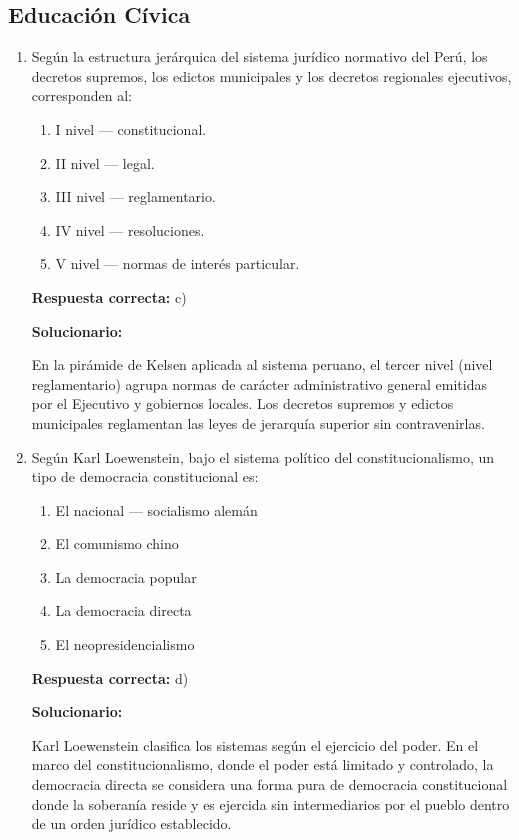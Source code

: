 \subsection*{Educación Cívica}

\begin{enumerate}[resume]
	
	\item Según la estructura jerárquica del sistema jurídico normativo del Perú, los decretos supremos, los edictos municipales y los decretos regionales ejecutivos, corresponden al:
	
	\begin{enumerate}[label=\alph*)]
		\item I nivel — constitucional.
		\item II nivel — legal.
		\item III nivel — reglamentario.
		\item IV nivel — resoluciones.
		\item V nivel — normas de interés particular.
	\end{enumerate}
	
	\textbf{Respuesta correcta:} c)
	
	\vspace{2mm}
	\textbf{Solucionario:}
	
	En la pirámide de Kelsen aplicada al sistema peruano, el tercer nivel (nivel reglamentario) agrupa normas de carácter administrativo general emitidas por el Ejecutivo y gobiernos locales. Los decretos supremos y edictos municipales reglamentan las leyes de jerarquía superior sin contravenirlas.
	
	\vspace{6mm}
	
	\item Según Karl Loewenstein, bajo el sistema político del constitucionalismo, un tipo de democracia constitucional es:
	
	\begin{enumerate}[label=\alph*)]
		\item El nacional — socialismo alemán
		\item El comunismo chino
		\item La democracia popular
		\item La democracia directa
		\item El neopresidencialismo
	\end{enumerate}
	
	\textbf{Respuesta correcta:} d)
	
	\vspace{2mm}
	\textbf{Solucionario:}
	
	Karl Loewenstein clasifica los sistemas según el ejercicio del poder. En el marco del constitucionalismo, donde el poder está limitado y controlado, la democracia directa se considera una forma pura de democracia constitucional donde la soberanía reside y es ejercida sin intermediarios por el pueblo dentro de un orden jurídico establecido.
	

	
\end{enumerate}


